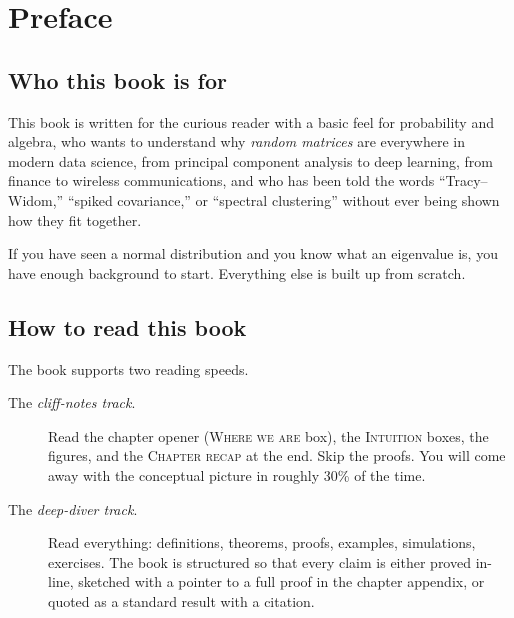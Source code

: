 
\chapter*{Preface}


\section*{Who this book is for}

This book is written for the curious reader with a basic feel for probability and algebra, who wants to understand why \emph{random matrices} are everywhere in modern data science, from principal component analysis to deep learning, from finance to wireless communications, and who has been told the words ``Tracy--Widom,'' ``spiked covariance,'' or ``spectral clustering'' without ever being shown how they fit together.

If you have seen a normal distribution and you know what an eigenvalue is, you have enough background to start. Everything else is built up from scratch.

\section*{How to read this book}

The book supports two reading speeds.

\begin{description}
  \item[The \emph{cliff-notes track}.] Read the chapter opener (\textsc{Where we are} box), the \textsc{Intuition} boxes, the figures, and the \textsc{Chapter recap} at the end. Skip the proofs. You will come away with the conceptual picture in roughly 30\% of the time.
  \item[The \emph{deep-diver track}.] Read everything: definitions, theorems, proofs, examples, simulations, exercises. The book is structured so that every claim is either proved in-line, sketched with a pointer to a full proof in the chapter appendix, or quoted as a standard result with a citation.
\end{description}

